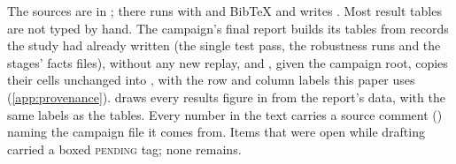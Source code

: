 
The sources are in ;  there runs  with
 and BibTeX and writes . Most result tables are not typed by
hand. The campaign's final report builds its tables from records the study had already written (the
single test pass, the robustness runs and the stages' facts files), without any new replay, and
, given the campaign root, copies
their cells unchanged into , with the row and column labels this paper uses
(\cref{app:provenance}).  draws every results figure in  from
the report's data, with the same labels as the tables. Every number in the text carries a source comment
() naming the campaign file it comes from. Items that were open while drafting
carried a boxed \textsc{pending} tag; none remains.

